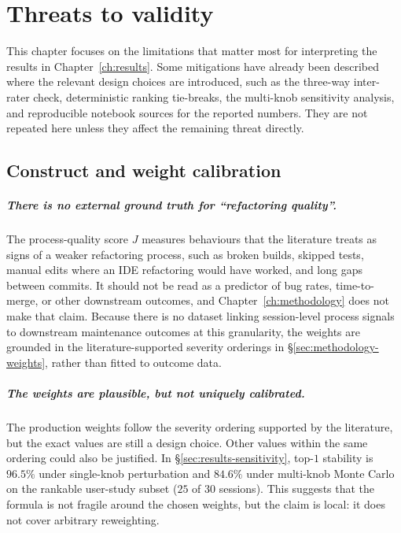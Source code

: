 \chapter{Threats to validity}
\label{ch:threats}

This chapter focuses on the limitations that matter most for interpreting the results in Chapter~\ref{ch:results}. Some mitigations have already been described where the relevant design choices are introduced, such as the three-way inter-rater check, deterministic ranking tie-breaks, the multi-knob sensitivity analysis, and reproducible notebook sources for the reported numbers. They are not repeated here unless they affect the remaining threat directly.

\section{Construct and weight calibration}
\label{sec:threats-construct}

\paragraph{There is no external ground truth for ``refactoring quality''.}
The process-quality score $J$ measures behaviours that the literature treats as signs of a weaker refactoring process, such as broken builds, skipped tests, manual edits where an IDE refactoring would have worked, and long gaps between commits. It should not be read as a predictor of bug rates, time-to-merge, or other downstream outcomes, and Chapter~\ref{ch:methodology} does not make that claim. Because there is no dataset linking session-level process signals to downstream maintenance outcomes at this granularity, the weights are grounded in the literature-supported severity orderings in \S\ref{sec:methodology-weights}, rather than fitted to outcome data.

\paragraph{The weights are plausible, but not uniquely calibrated.}
The production weights follow the severity ordering supported by the literature, but the exact values are still a design choice. Other values within the same ordering could also be justified. In \S\ref{sec:results-sensitivity}, top-$1$ stability is $96.5\%$ under single-knob perturbation and $84.6\%$ under multi-knob Monte Carlo on the rankable user-study subset ($25$ of $30$ sessions). This suggests that the formula is not fragile around the chosen weights, but the claim is local: it does not cover arbitrary reweighting.

